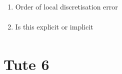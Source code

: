 \documentclass{X:/Documents/Coding/Latex/myassignment}
\begin{document}
\begin{enumerate}
\begin{enumerate}
        \item Order of local discretisation error
        \begin{align*}            
        \end{align*}
        \item Is this explicit or implicit
        \begin{align*}      
        \end{align*} 
    \end{enumerate}
\end{enumerate}

\section{Tute 6}
\end{document}
